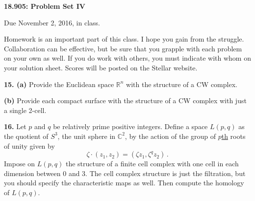 \documentclass[12pt]{article}
\begin{document}
\thispagestyle{empty}

\def\da#1{\downarrow\rlap{$\vcenter{\hbox{$\scriptstyle#1$}}$}}
\def\ua#1{\uparrow\rlap{$\vcenter{\hbox{$\scriptstyle#1$}}$}}

\def\coker{\mathrm{coker}\,}
\def\im{\mathrm{im}\,}
\def\ker{\mathrm{ker}\,}
\def\NN{\mathbb N}
\def\ZZ{\mathbb Z}
\def\RR{\mathbb R}
\def\QQ{\mathbb Q} 
\def\CC{\mathbb C}
\def\Ext{\mathrm{Ext}}
\def\Tor{\mathrm{Tor}}
\def\Hom{\mathrm{Hom}}
\def\Der{\mathrm{Der}}
\def\Map{\mathrm{Map}}
\def\Gp{\mathbf{Gp}}
\def\Mon{\mathbf{Mon}}
\def\mod{\hbox{mod}}
\def\be{\begin{equation}}
\def\ee{\end{equation}}
\def\tensor{\otimes}
\def\iso{\cong}
\def\Ho{\mathrm{Ho}\,}
\def\rin{\mathrm{in}}
\def\la#1{\mathop{\longleftarrow}\limits^{#1}}
\def\ra#1{\mathop{\longrightarrow}\limits^{#1}}
\def\bS{\mathbf{S}}

\def\inj{\mathrm{in}}
\def\pr{\mathrm{pr}}
\def\div{\mathrm{div}}
\def\grad{\mathrm{grad}}
\def\curl{\mathrm{curl}}
\def\Sin{\mathrm{Sin}}

\def\SF{\mathcal{C}^\infty}
\def\VF{\mathcal{VF}^\infty}


\def\TT{\mathbb{T}}
\def\Tensor{\bigotimes}
\def\bDelta{\mathbf{\Delta}}
\def\bSet{\mathbf{Set}}
\def\bAb{\mathbf{Ab}}
\def\bTop{\mathbf{Top}}
\def\bC{\mathbf{C}}
\def\ob{\mathrm{ob}}
\def\bVS{\mathbf{VS}}



\begin{center}
{\bf 18.905: Problem Set IV}
\end{center}

Due November 2, 2016, in class. 

Homework is an important part of this class. I hope you gain from the
struggle. Collaboration can be effective, but be sure that you
grapple with each problem on your own as well. If you do work with others,
you must indicate with whom on your solution sheet. Scores will be posted
on the Stellar website.

\bigskip
{\bf 15. (a)} Provide the Euclidean space $\RR^n$ with the structure of a 
CW complex. 

{\bf (b)} Provide each compact surface with the structure of a CW 
complex with just a single 2-cell. 


\medskip
{\bf 16.} Let $p$ and $q$ be relatively prime positive integers. Define a 
space $L(p,q)$ as the quotient of $S^3$, the unit sphere in $\CC^2$, by 
the action of the group of $p$\underline{th} roots of unity given by
\[
\zeta\cdot(z_1,z_2)=(\zeta z_1,\zeta^qz_2)\,.
\]
Impose on $L(p,q)$  the structure of a finite cell complex with one
cell in each dimension between 0 and 3. The cell complex structure is just
the filtration, but you should specify the characteristic maps as well.
Then compute the homology of $L(p,q)$.
\end{document}
